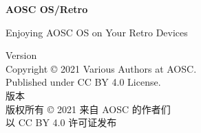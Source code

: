 \documentclass[a4paper,11pt]{article}
\begin{document}
{{\begin{minipage}[t][180mm][t]{130mm}
                {

                    
                    \bfseries
                    \LARGE
                    AOSC OS/Retro

                    \vspace{5pt}
                    {
                        \rmfamily
                        \normalsize\mdseries
                        Enjoying AOSC OS on Your Retro Devices
                    }
                }

                
            \end{minipage}
        }%
    }

        \color{white}

        \hspace{1pt}
        \vfill

        \small\sffamily\mdseries
        \baselineskip=16pt

        {Version}{ }{\docversion}\\
        Copyright {\copyright} 2021 Various Authors at AOSC.\\
        Published under CC BY 4.0 License.\\
        {版本}{ }{\docversion}\\
        版权所有 {\copyright} 2021 来自 AOSC 的作者们\\
        以{ }CC BY 4.0{ }许可证发布

        
\end{document}
